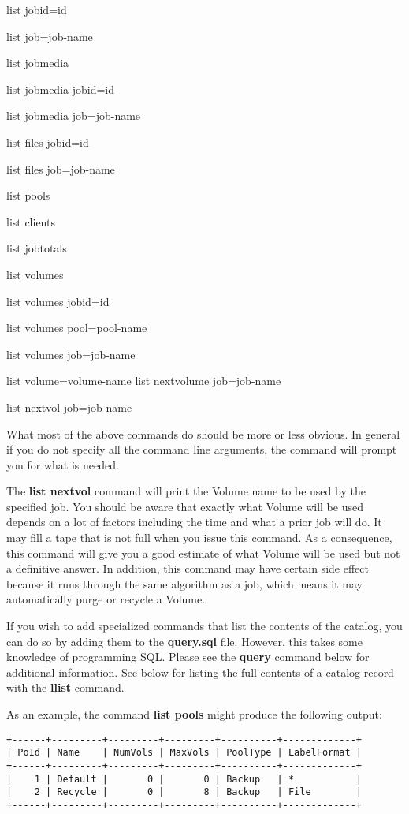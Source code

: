 \begin{description}
list jobid=\lt{}id\gt{}

list job=\lt{}job-name\gt{}

list jobmedia

list jobmedia jobid=\lt{}id\gt{}

list jobmedia job=\lt{}job-name\gt{}

list files jobid=\lt{}id\gt{}

list files job=\lt{}job-name\gt{}

list pools

list clients

list jobtotals

list volumes

list volumes jobid=\lt{}id\gt{}

list volumes pool=\lt{}pool-name\gt{}

list volumes job=\lt{}job-name\gt{}

list volume=\lt{}volume-name\gt{}  list nextvolume job=\lt{}job-name\gt{}

list nextvol job=\lt{}job-name\gt{}

What most of the above commands do should be more or  less obvious. In general
if you do not specify all  the command line arguments, the command will prompt
you  for what is needed.  

The {\bf list nextvol} command will print the Volume  name to be used by the
specified job. You should be aware  that exactly what Volume will be used
depends on a lot  of factors including the time and what a prior job  will do.
It may fill a tape that is not full when  you issue this command. As a
consequence, this command  will give you a good estimate of what Volume will
be  used but not a definitive answer. In addition, this  command may have
certain side effect because it  runs through the same algorithm as a job, 
which means it may automatically purge or recycle a  Volume.  

If you wish to add specialized commands that list the contents  of the
catalog, you can do so by adding them to the  {\bf query.sql} file. However,
this takes some knowledge  of programming SQL. Please see the {\bf query}
command below for  additional information. See below for listing the full
contents  of a catalog record with the {\bf llist} command.  

As an example, the command {\bf list pools} might produce  the following
output: 

\footnotesize
\begin{verbatim}
+------+---------+---------+---------+----------+-------------+
| PoId | Name    | NumVols | MaxVols | PoolType | LabelFormat |
+------+---------+---------+---------+----------+-------------+
|    1 | Default |       0 |       0 | Backup   | *           |
|    2 | Recycle |       0 |       8 | Backup   | File        |
+------+---------+---------+---------+----------+-------------+
\end{verbatim}
\normalsize


\end{description}

